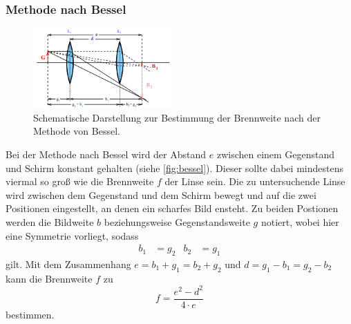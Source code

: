     \subsubsection{Methode nach Bessel}
        \begin{figure}
            \centering
            \includegraphics[width=0.48\textwidth]{content/bessel.png}
            \caption{Schematische Darstellung zur Bestimmung der Brennweite nach der Methode von Bessel.}
            \label{fig:bessel}
        \end{figure}
        Bei der Methode nach Bessel wird der Abstand $e$ zwischen einem Gegenstand und Schirm konstant gehalten (siehe \autoref{fig:bessel}).
        Dieser sollte dabei mindestens viermal so groß wie die Brennweite $f$ der Linse sein. Die zu untersuchende Linse wird zwischen dem
        Gegenstand und dem Schirm bewegt und auf die zwei Positionen eingestellt, an denen ein scharfes Bild ensteht. Zu beiden Postionen
        werden die Bildweite $b$ beziehungsweise Gegenstandsweite $g$ notiert, wobei hier eine Symmetrie vorliegt, sodass
        \begin{align*}
        b_1 &= g_2 & b_2 &= g_1
        \end{align*}
        gilt.
        Mit dem Zusammenhang $e = b_1 + g_1 = b_2 + g_2$ und $d = g_1 - b_1 = g_2 - b_2$ kann die Brennweite $f$ zu 
        \begin{equation}
        \label{eqn:bessel}
        f = \frac{e^2 -d^2}{4 \cdot e}
        \end{equation}
        bestimmen.
